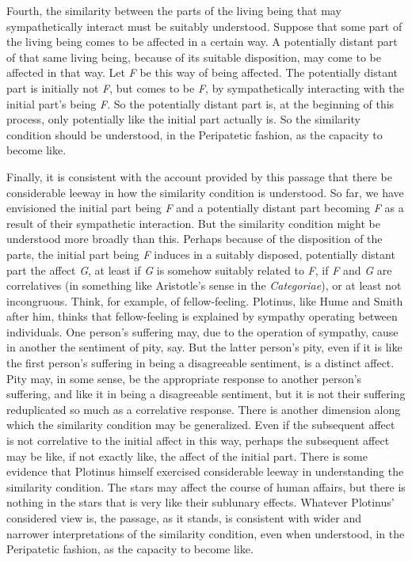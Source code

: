 Fourth, the similarity between the parts of the living being that may sympathetically interact must be suitably understood. Suppose that some part of the living being comes to be affected in a certain way. A potentially distant part of that same living being, because of its suitable disposition, may come to be affected in that way. Let \emph{F} be this way of being affected. The potentially distant part is initially not \emph{F}, but comes to be \emph{F}, by sympathetically interacting with the initial part's being \emph{F}. So the potentially distant part is, at the beginning of this process, only potentially like the initial part actually is. So the similarity condition should be understood, in the Peripatetic fashion, as the capacity to become like.

Finally, it is consistent with the account provided by this passage that there be considerable leeway in how the similarity condition is understood. So far, we have envisioned the initial part being \emph{F} and a potentially distant part becoming \emph{F} as a result of their sympathetic interaction. But the similarity condition might be understood more broadly than this. Perhaps because of the disposition of the parts, the initial part being \emph{F} induces in a suitably disposed, potentially distant part the affect \emph{G}, at least if \emph{G} is somehow suitably related to \emph{F}, if \emph{F} and \emph{G} are correlatives (in something like Aristotle's sense in the \emph{Categoriae}), or at least not incongruous. Think, for example, of fellow-feeling. Plotinus, like Hume and Smith after him, thinks that fellow-feeling is explained by sympathy operating between individuals. One person's suffering may, due to the operation of sympathy, cause in another the sentiment of pity, say. But the latter person's pity, even if it is like the first person's suffering in being a disagreeable sentiment, is a distinct affect. Pity may, in some sense, be the appropriate response to another person's suffering, and like it in being a disagreeable sentiment, but it is not their suffering reduplicated so much as a correlative response. There is another dimension along which the similarity condition may be generalized. Even if the subsequent affect is not correlative to the initial affect in this way, perhaps the subsequent affect may be like, if not exactly like, the affect of the initial part. There is some evidence that Plotinus himself exercised considerable leeway in understanding the similarity condition. The stars may affect the course of human affairs, but there is nothing in the stars that is very like their sublunary effects. Whatever Plotinus' considered view is, the passage, as it stands, is consistent with wider and narrower interpretations of the similarity condition, even when understood, in the Peripatetic fashion, as the capacity to become like.

